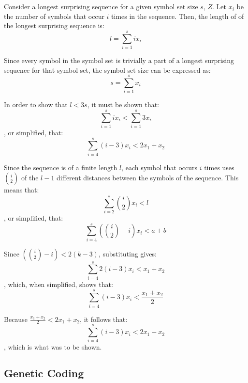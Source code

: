 \documentclass[twocolumn,oneside]{amsart}
\begin{document}
Consider a longest surprising sequence for a given symbol set size $ s $, $ Z $.
Let $ x_i $ be the number of symbols that occur $ i $ times in the sequence.
Then, the length of of the longest surprising sequence is:
\begin{equation}
l = \sum_{i=1}^{s} i x_i
\end{equation}

Since every symbol in the symbol set is trivially a part of a longest surprising sequence for that symbol set, the symbol set size can be expressed as:
\begin{equation}
s = \sum_{i=1}^{s} x_i
\end{equation}

In order to show that $ l < 3s $, it must be shown that:
\begin{equation}
\sum_{i=1}^{s} i x_i < \sum_{i=1}^{s} 3 x_i
\end{equation}
, or simplified, that:
\begin{equation}
\sum_{i=4}^{s} (i - 3) x_i < 2x_1 + x_2
\end{equation}

Since the sequence is of a finite length $ l $, each symbol that occurs $ i $ times uses  $ i \choose 2 $ of the $ l - 1 $ different distances between the symbols of the sequence.
This means that:
\begin{equation}
    \sum_{i=2}^{s} {i \choose 2} x_i < l
\end{equation}
, or simplified, that:
\begin{equation}
    \sum_{i=4}^{s} ({i \choose 2} - i) x_i < a + b
\end{equation}

Since $ ({i \choose 2} - i) < 2(k - 3) $, substituting gives:
\begin{equation}
\sum_{i=4}^{s} 2(i - 3) x_i < x_1 + x_2
\end{equation}
, which, when simplified, shows that:
\begin{equation}
\sum_{i=4}^{s} (i - 3) x_i < \frac{x_1 + x_2}{2}
\end{equation}

Because $ \frac{x_1 + x_2}{2} < 2x_1 + x_2 $, it follows that:
\begin{equation}
\sum_{i=4}^{s} (i - 3) x_i < 2x_1 - x_2
\end{equation}
, which is what was to be shown.

\subsection{Genetic Coding}
\end{document}
